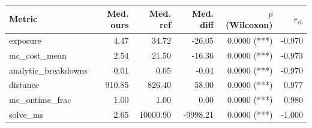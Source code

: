 \begin{tabular}{lrrrrr}
\toprule
Metric & Med. ours & Med. ref & Med. diff & $p$ (Wilcoxon) & $r_{rb}$ \\
\midrule
exposure & 4.47 & 34.72 & -26.05 & 0.0000 (***) & -0.970 \\
mc_cost_mean & 2.54 & 21.50 & -16.36 & 0.0000 (***) & -0.973 \\
analytic_breakdowns & 0.01 & 0.05 & -0.04 & 0.0000 (***) & -0.970 \\
distance & 910.85 & 826.40 & 58.00 & 0.0000 (***) & 0.977 \\
mc_ontime_frac & 1.00 & 1.00 & 0.00 & 0.0000 (***) & 0.980 \\
solve_ms & 2.65 & 10000.90 & -9998.21 & 0.0000 (***) & -1.000 \\
\bottomrule
\end{tabular}
